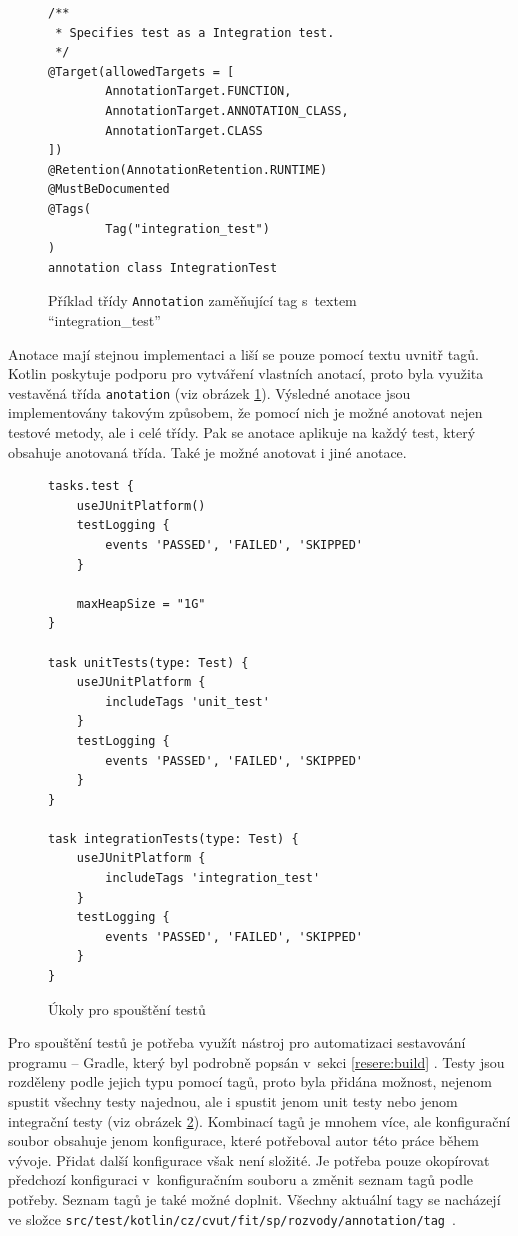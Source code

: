     \begin{figure}
        \begin{verbatim}
/**
 * Specifies test as a Integration test.
 */
@Target(allowedTargets = [
        AnnotationTarget.FUNCTION,
        AnnotationTarget.ANNOTATION_CLASS,
        AnnotationTarget.CLASS
])
@Retention(AnnotationRetention.RUNTIME)
@MustBeDocumented
@Tags(
        Tag("integration_test")
)
annotation class IntegrationTest
        \end{verbatim}
        \caption{Příklad třídy \texttt{Annotation} zaměňující tag s~textem \enquote{integration\_test}} 
        \label{code:annotation-class}
    \end{figure}
    Anotace mají stejnou implementaci a liší se pouze pomocí textu uvnitř tagů. Kotlin poskytuje podporu pro vytváření vlastních anotací, proto byla využita vestavěná třída \verb|anotation| (viz obrázek \ref{code:annotation-class}). Výsledné anotace jsou implementovány takovým způsobem, že pomocí nich je možné anotovat nejen testové metody, ale i celé třídy. Pak se anotace aplikuje na každý test, který obsahuje anotovaná třída. Také je možné anotovat i jiné anotace.

    \begin{figure}
        \begin{verbatim}
tasks.test {
    useJUnitPlatform()
    testLogging {
        events 'PASSED', 'FAILED', 'SKIPPED'
    }

    maxHeapSize = "1G"
}

task unitTests(type: Test) {
    useJUnitPlatform {
        includeTags 'unit_test'
    }
    testLogging {
        events 'PASSED', 'FAILED', 'SKIPPED'
    }
}

task integrationTests(type: Test) {
    useJUnitPlatform {
        includeTags 'integration_test'
    }
    testLogging {
        events 'PASSED', 'FAILED', 'SKIPPED'
    }
}
        \end{verbatim}
        \caption{Úkoly pro spouštění testů} 
        \label{code:gradle-tests}
    \end{figure}
    Pro spouštění testů je potřeba využít nástroj pro automatizaci sestavování programu -- Gradle, který byl podrobně popsán v~sekci \ref{resere:build} . Testy jsou rozděleny podle jejich typu pomocí tagů, proto byla přidána možnost, nejenom spustit všechny testy najednou, ale i spustit jenom unit testy nebo jenom integrační testy (viz obrázek \ref{code:gradle-tests}). Kombinací tagů je mnohem více, ale konfigurační soubor obsahuje jenom konfigurace, které potřeboval autor této práce během vývoje. 
    Přidat další konfigurace však není složité. Je potřeba pouze okopírovat předchozí konfiguraci v~konfiguračním souboru a změnit seznam tagů podle potřeby. Seznam tagů je také možné doplnit. Všechny aktuální tagy se nacházejí ve složce \verb|src/test/kotlin/cz/cvut/fit/sp/rozvody/annotation/tag|~.
    
